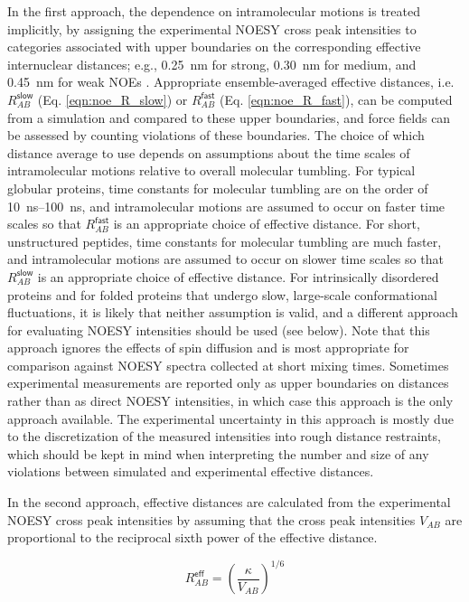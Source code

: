 \documentclass[9pt,review]{livecoms}
\begin{document}
In the first approach, the dependence on intramolecular motions is treated implicitly, by assigning the experimental NOESY cross peak intensities to categories associated with upper boundaries on the corresponding effective internuclear distances; e.g., \qty{0.25}{\nano\meter} for strong, \qty{0.30}{\nano\meter} for medium, and \qty{0.45}{\nano\meter} for weak NOEs \cite{smith_structure_1993}.
Appropriate ensemble-averaged effective distances, i.e. $R_{AB}^{\mathsf{slow}}$ (Eq. \ref{eqn:noe_R_slow}) or $R_{AB}^{\mathsf{fast}}$ (Eq. \ref{eqn:noe_R_fast}), can be computed from a simulation and compared to these upper boundaries, and force fields can be assessed by counting violations of these boundaries.
The choice of which distance average to use depends on assumptions about the time scales of intramolecular motions relative to overall molecular tumbling.
For typical globular proteins, time constants for molecular tumbling are on the order of \qtyrange{10}{100}{\nano\second}, and intramolecular motions are assumed to occur on faster time scales so that $R_{AB}^{\mathsf{fast}}$ is an appropriate choice of effective distance.
For short, unstructured peptides, time constants for molecular tumbling are much faster, and intramolecular motions are assumed to occur on slower time scales so that $R_{AB}^{\mathsf{slow}}$ is an appropriate choice of effective distance.
For intrinsically disordered proteins and for folded proteins that undergo slow, large-scale conformational fluctuations, it is likely that neither assumption is valid, and a different approach for evaluating NOESY intensities should be used (see below).
Note that this approach ignores the effects of spin diffusion and is most appropriate for comparison against NOESY spectra collected at short mixing times.
Sometimes experimental measurements are reported only as upper boundaries on distances rather than as direct NOESY intensities, in which case this approach is the only approach available.
The experimental uncertainty in this approach is mostly due to the discretization of the measured intensities into rough distance restraints, which should be kept in mind when interpreting the number and size of any violations between simulated and experimental effective distances.

In the second approach, effective distances are calculated from the experimental NOESY cross peak intensities by assuming that the cross peak intensities $V_{AB}$ are proportional to the reciprocal sixth power of the effective distance.

\begin{equation}
\label{eqn:noesy_sixth_power}
R_{AB}^{\mathsf{eff}} = \left( \frac {\kappa} {V_{AB}} \right)^{1/6}
\end{equation}
\end{document}
